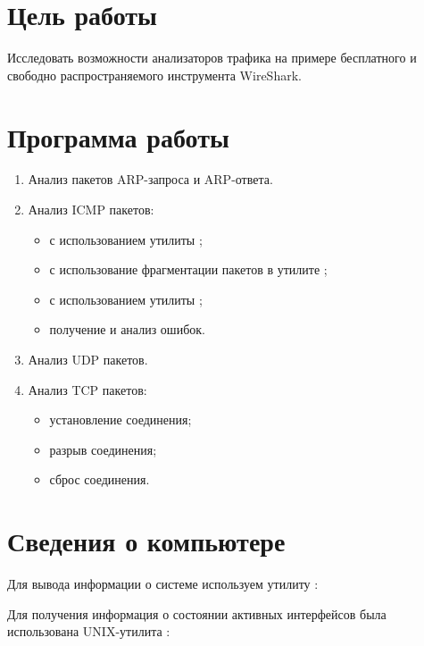 





\tableofcontents
\newpage

\section{Цель работы}

Исследовать возможности анализаторов трафика на примере бесплатного и свободно распространяемого инструмента WireShark.

\section{Программа работы}

\begin{enumerate}
	\item Анализ пакетов ARP-запроса и ARP-ответа.
	\item Анализ ICMP пакетов:
		\begin{itemize}
			\item с использованием утилиты ;
			\item с использование фрагментации пакетов в утилите ;
			\item с использованием утилиты ;
			\item получение и анализ ошибок.
		\end{itemize}
	\item Анализ UDP пакетов.
	\item Анализ TCP пакетов:
		\begin{itemize}
			\item установление соединения;
			\item разрыв соединения;
			\item сброс соединения.
		\end{itemize}
\end{enumerate}

\section{Сведения о компьютере}

Для вывода информации о системе используем утилиту :


Для получения информация о состоянии активных интерфейсов была использована UNIX-утилита :


